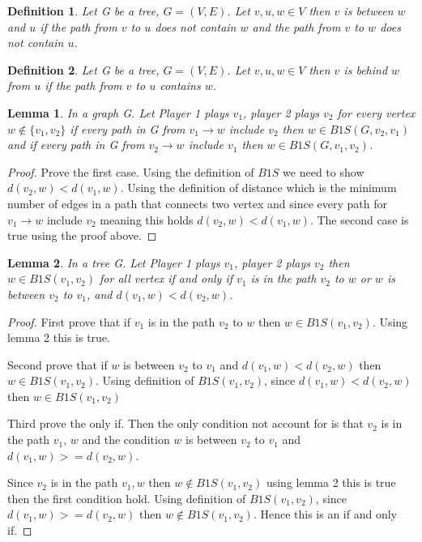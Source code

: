 \documentclass{article}
\newtheorem{lemma}{Lemma}
\newtheorem{definition}{Definition}
\begin{document}
\begin{definition}
Let G be a tree, \(G=(V,E)\). Let \( v,u,w \in V \) then \(v\) is between \(w\) and \(u\) if the path from \(v\) to \(u\) does not contain \(w\) and  the path from \(v\) to \(w\) does not contain \(u\).
\end{definition}

\begin{definition}
Let G be a tree, \(G=(V,E)\). Let \( v,u,w \in V \) then \(v\) is behind \(w\) from \(u\) if the path from \(v\) to \(u\) contains \(w\).
\end{definition}


\begin{lemma}
In a graph G. Let Player 1 plays \( v_1 \), player 2 plays  \( v_2 \) for every vertex \( w \notin  \{v_1,v_2\} \) if every path in G from \( v_1 \to w\) include \( v_2 \) then \( w \in B1S(G,v_2,v_1)\) and  if every path in G from \( v_2 \to w\) include \( v_1 \) then \( w \in B1S(G,v_1,v_2)\).
\end{lemma}

\begin{proof}
Prove the first case. Using the definition of \(B1S\) we need to show  \(d(v_2, w) < d(v_1, w)\). Using the definition of distance which is the minimum number of edges in a path that connects two vertex and since every path for \( v_1 \to w\) include \( v_2 \) meaning this holds \(d(v_2, w) < d(v_1, w)\). The second case is true using the proof above.
\end{proof}

\begin{lemma}
In a tree G. Let Player 1 plays \( v_1 \), player 2 plays  \( v_2 \) then \( w \in  B1S(v_1, v_2) \) for all vertex if and only if \( v_1 \) is in the path \(v_2\) to \( w \)  or \( w \) is between \(v_2\) to \(v_1\), and \(d(v_1,w)<d(v_2,w)\).
\end{lemma}

\begin{proof}
First prove that if \( v_1 \) is in the path \(v_2\) to \( w \) then \( w \in  B1S(v_1, v_2) \). Using lemma 2 this is true.

Second prove that if  \( w \) is between \(v_2\) to \(v_1\) and \(d(v_1,w)<d(v_2,w)\) then \( w \in  B1S(v_1, v_2) \). Using definition of \(B1S(v_1, v_2) \), since \(d(v_1,w)<d(v_2,w)\) then \( w \in  B1S(v_1, v_2) \)

Third prove the only if. Then the only condition not account for is that \( v_2 \) is in the path \(v_1 \), \( w\) and the condition  \( w \) is between \(v_2\) to \(v_1\) and \(d(v_1,w)>=d(v_2,w)\). 

Since \( v_2 \) is in the path \(v_1, w\) then \( w \notin  B1S(v_1, v_2) \) using lemma 2 this is true then the first condition hold. Using definition of \(B1S(v_1, v_2) \), since \(d(v_1,w)>=d(v_2,w)\) then \( w \notin  B1S(v_1, v_2) \). Hence this is an if and only if.

\end{proof}
\end{document}
